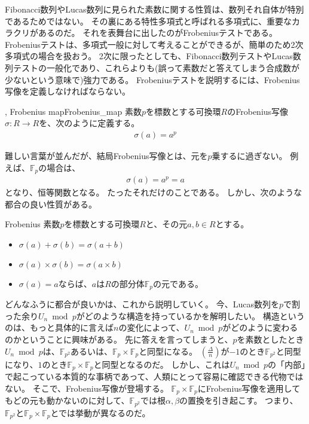 Fibonacci数列やLucas数列に見られた素数に関する性質は、数列それ自体が特別であるためではない。
その裏にある特性多項式と呼ばれる多項式に、重要なカラクリがあるのだ。
それを表舞台に出したのがFrobeniusテストである。
Frobeniusテストは、多項式一般に対して考えることができるが、簡単のため2次多項式の場合を扱おう。
2次に限ったとしても、Fibonacci数列テストやLucas数列テストの一般化であり、これらよりも(誤って素数だと答えてしまう合成数が少ないという意味で)強力である。
Frobeniusテストを説明するには、Frobenius写像を定義しなければならない。

\begin{Defi}{, Frobenius map}{Frobenius_map}
素数$p$を標数とする可換環$R$のFrobenius写像$\sigma:R\to R$を、次のように定義する。
\begin{align*}
\sigma(a) = a^p
\end{align*}
\end{Defi}

難しい言葉が並んだが、結局Frobenius写像とは、元を$p$乗するに過ぎない。
例えば、$\mathbb{F}_p$の場合は、
\begin{align*}
\sigma(a) = a^p = a
\end{align*}
となり、恒等関数となる。
たったそれだけのことである。
しかし、次のような都合の良い性質がある。

\begin{Prop}{}{Frobenius}
素数$p$を標数とする可換環$R$と、その元$a,b\in R$とする。
\begin{itemize}
\item $\sigma(a) + \sigma(b) = \sigma(a + b)$
\item $\sigma(a) \times \sigma(b) = \sigma(a \times b)$
\item $\sigma(a) = a$ならば、$a$は$R$の部分体$\mathbb{F}_p$の元である。
\end{itemize}
\end{Prop}

どんなふうに都合が良いかは、これから説明していく。
今、Lucas数列を$p$で割った余り$U_n \bmod{p}$がどのような構造を持っているかを解明したい。
構造というのは、もっと具体的に言えば$n$の変化によって、$U_n \bmod{p}$がどのように変わるのかということに興味がある。
先に答えを言ってしまうと、$p$を素数としたとき$U_n \bmod{p}$は、$\mathbb{F}_{p^2}$あるいは、$\mathbb{F}_p\times\mathbb{F}_p$と同型になる。
$\left(\frac{\Delta}{n}\right)$が$-1$のとき$\mathbb{F}_{p^2}$と同型になり、$1$のとき$\mathbb{F}_p\times\mathbb{F}_p$と同型となるのだ。
しかし、これは$U_n \bmod{p}$の「内部」で起こっている本質的な事柄であって、人類にとって容易に確認できる代物ではない。
そこで、Frobenius写像が登場する。
$\mathbb{F}_p\times\mathbb{F}_p$にFrobenius写像を適用してもどの元も動かないのに対して、$\mathbb{F}_{p^2}$では根$\alpha,\beta$の置換を引き起こす。
つまり、$\mathbb{F}_{p^2}$と$\mathbb{F}_p\times\mathbb{F}_p$とでは挙動が異なるのだ。

